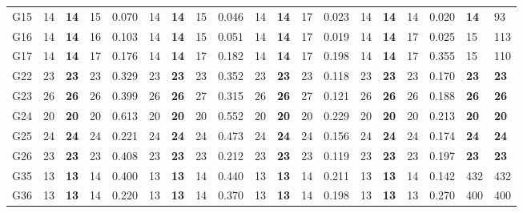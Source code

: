 \documentclass[12pt, a4paper]{article}%
\numberwithin{equation}{section}
\theoremstyle{plain}
\begin{document}
{\begin{landscape}
\begin{longtable}{lllllllllllllllllll}
						G15                       & 14   & \textbf{14} & 15  & 0.070  & 14   & \textbf{14} & 15  & 0.046  & 14   & \textbf{14} & 17  & 0.023  & 14   & \textbf{14} & 14  & 0.020   & \textbf{14}             & 93                   \\
						G16                       & 14   & \textbf{14} & 16  & 0.103  & 14   & \textbf{14} & 15  & 0.051  & 14   & \textbf{14} & 17  & 0.019  & 14   & \textbf{14} & 17  & 0.025   & 15                      & 113                  \\
						G17                       & 14   & \textbf{14} & 17  & 0.176  & 14   & \textbf{14} & 17  & 0.182  & 14   & \textbf{14} & 17  & 0.198  & 14   & \textbf{14} & 17  & 0.355   & 15                      & 110                  \\
						G22                       & 23   & \textbf{23} & 23  & 0.329  & 23   & \textbf{23} & 23  & 0.352  & 23   & \textbf{23} & 23  & 0.118  & 23   & \textbf{23} & 23  & 0.170   & \textbf{23}             & \textbf{23}          \\
						G23                       & 26   & \textbf{26} & 26  & 0.399  & 26   & \textbf{26} & 27  & 0.315  & 26   & \textbf{26} & 27  & 0.121  & 26   & \textbf{26} & 26  & 0.188   & \textbf{26}             & \textbf{26}          \\
						G24                       & 20   & \textbf{20} & 20  & 0.613  & 20   & \textbf{20} & 20  & 0.552  & 20   & \textbf{20} & 20  & 0.229  & 20   & \textbf{20} & 20  & 0.213   & \textbf{20}             & \textbf{20}          \\
						G25                       & 24   & \textbf{24} & 24  & 0.221  & 24   & \textbf{24} & 24  & 0.473  & 24   & \textbf{24} & 24  & 0.156  & 24   & \textbf{24} & 24  & 0.174   & \textbf{24}             & \textbf{24}          \\
						G26                       & 23   & \textbf{23} & 23  & 0.408  & 23   & \textbf{23} & 23  & 0.212  & 23   & \textbf{23} & 23  & 0.119  & 23   & \textbf{23} & 23  & 0.197   & \textbf{23}             & \textbf{23}          \\
						G35                       & 13   & \textbf{13} & 14  & 0.400  & 13   & \textbf{13} & 14  & 0.440  & 13   & \textbf{13} & 14  & 0.211  & 13   & \textbf{13} & 14  & 0.142   & 432                     & 432                  \\
						G36                       & 13   & \textbf{13} & 14  & 0.220  & 13   & \textbf{13} & 14  & 0.370  & 13   & \textbf{13} & 14  & 0.198  & 13   & \textbf{13} & 13  & 0.270   & 400                     & 400                  \\

\end{longtable}
\end{landscape}}
\end{document}
